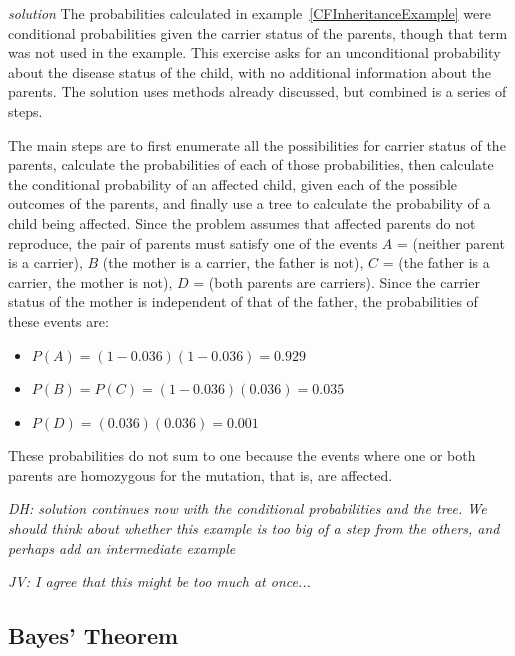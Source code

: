 \begin{doublespace}
\begin{example}
	
\textit{solution}
The probabilities calculated in example~\ref{CFInheritanceExample} were conditional probabilities given the carrier status of the parents, though that term was not used in the example.  This exercise asks for an unconditional probability about the disease status of the child, with no additional information about the parents.  The solution uses methods already discussed, but combined is a series of steps.  

The main steps are to first enumerate all the possibilities for carrier status of the parents, calculate the probabilities of each of those probabilities, then calculate the conditional probability of an affected child, given each of the possible outcomes of the parents, and finally use a tree to calculate the probability of a child being affected. Since the problem assumes that affected parents do not reproduce, the pair of parents must satisfy one of the events $A$ = (neither parent is a carrier), $B$ (the mother is a carrier, the father is not), $C$ = (the father is a carrier, the mother is not), $D$ = (both parents are carriers). Since the carrier status of the mother is independent of that of the father, the probabilities of these events are:

\begin{itemize}
	\item $P(A) = (1 - 0.036)(1 - 0.036) = 0.929$
	
	\item $P(B) = P(C) = (1 - 0.036)(0.036) = 0.035$
	
	\item $P(D) = (0.036)(0.036) = 0.001$
\end{itemize}
	
These probabilities do not sum to one because the events where one or both parents are homozygous for the mutation, that is, are affected.

\textit{DH: solution continues now with the conditional probabilities and the tree.  We should think about whether this example is too big of a step from the others, and perhaps add an intermediate example}

\textit{JV: I agree that this might be too much at once... }

\end{example}

\subsection{Bayes' Theorem}
\label{bayesTheoremSubsection}


\end{doublespace}
